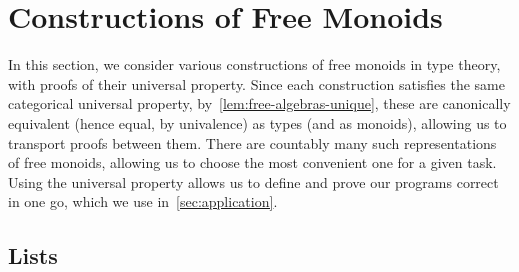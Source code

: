 
\section{Constructions of Free Monoids}
\label{sec:monoids}

In this section, we consider various constructions of free monoids in type theory,
with proofs of their universal property.
%
Since each construction satisfies the same categorical universal property,
by~\cref{lem:free-algebras-unique},
these are canonically equivalent (hence equal, by univalence) as types (and as monoids),
allowing us to transport proofs between them.
%
There are countably many such representations of free monoids, allowing us to
choose the most convenient one for a given task.
Using the universal property allows us to define and prove our programs correct in one go,
which we use in~\cref{sec:application}.

\subsection{Lists}
\label{sec:lists}

